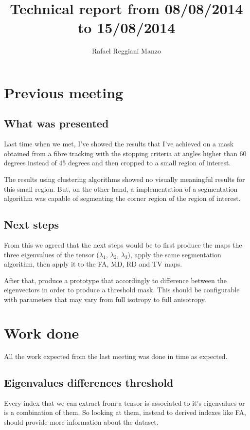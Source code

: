\documentclass[a4paper,11pt]{report}
\title{Technical report from 08/08/2014 to 15/08/2014}
\author{Rafael Reggiani Manzo}
\begin{document}
\maketitle
\tableofcontents

\chapter{Previous meeting}
  \section{What was presented}
  Last time when we met, I've showed the results that I've achieved on a mask obtained from a fibre tracking with the stopping criteria at angles higher than 60 degrees instead of 45 degrees and then cropped to a small region of interest.

  The results using clustering algorithms showed no visually meaningful results for this small region. But, on the other hand, a implementation of a segmentation algorithm was capable of segmenting the corner region of the region of interest.

  \section{Next steps}
  From this we agreed that the next steps would be to first produce the maps the three eigenvalues of the tensor ($\lambda_1$, $\lambda_2$, $\lambda_3$), apply the same segmentation algorithm, then apply it to the FA, MD, RD and TV maps.

  After that, produce a prototype that accordingly to difference between the eigenvectors in order to produce a threshold mask. This should be configurable with parameters that may vary from full isotropy to full anisotropy.

\chapter{Work done}
  All the work expected from the last meeting was done in time as expected.

  \section{Eigenvalues differences threshold}
    Every index that we can extract from a tensor is associated to it's eigenvalues or is a combination of them. So looking at them, instead to derived indexes like FA, should provide more information about the dataset.
\end{document}
